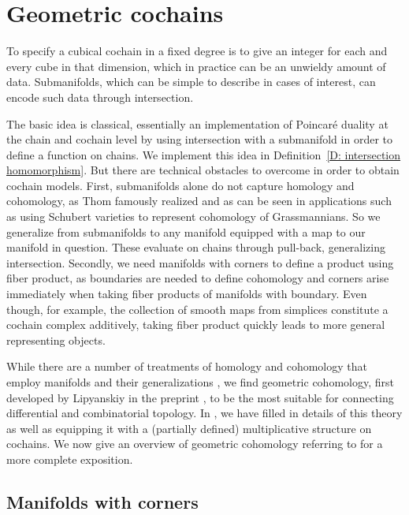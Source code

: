 
\section{Geometric cochains}\label{S:geometric cochains}

To specify a cubical cochain in a fixed degree is to give an integer for each and every cube in that dimension, which in practice can be an unwieldy amount of data.
Submanifolds, which can be simple to describe in cases of interest, can encode such data through intersection.

The basic idea is classical, essentially an implementation of Poincar\'e duality at the chain and cochain level by using intersection with a submanifold in order to define a function on chains.
We implement this idea in Definition~\ref{D: intersection homomorphism}.
But there are technical obstacles to overcome in order to obtain cochain models.
First, submanifolds alone do not capture homology and cohomology, as Thom famously realized and as can be seen in applications such as using Schubert varieties to represent cohomology of Grassmannians.
So we generalize from submanifolds to any manifold equipped with a map to our manifold in question.
These evaluate on chains through pull-back, generalizing intersection.
Secondly, we need manifolds with corners to define a product using fiber product, as boundaries are needed to define cohomology and corners arise immediately when taking fiber products of manifolds with boundary. Even though, for example, the collection of smooth maps from simplices constitute a cochain complex additively, taking fiber product quickly leads to more general representing objects.

While there are a number of treatments of homology and cohomology that employ manifolds and their generalizations \cite{Whit47, BRS76, FeSj83, Krec10, Kahn01, Zing08, Joyc15}, we find {geometric cohomology}, first developed by Lipyanskiy in the preprint \cite{Lipy14}, to be the most suitable for connecting differential and combinatorial topology.
In \cite{medina2022foundations}, we have filled in details of this theory as well as equipping it with a (partially defined) multiplicative structure on cochains.
We now give an overview of geometric cohomology referring to \cite{medina2022foundations} for a more complete exposition.

\subsection{Manifolds with corners}

